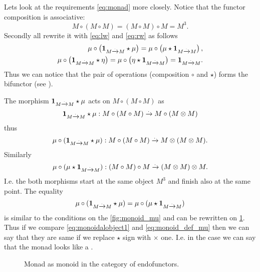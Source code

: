Lets look at the requirements \eqref{eq:monad} more closely. Notice
that the functor composition is associative:
\[
M \circ ( M \circ M ) = (M \circ M) \circ M = M^3.
\]
Secondly 
all rewrite it with \eqref{eq:lw} and \eqref{eq:rw} as follows
\begin{eqnarray}
  \mu \circ \left( \mathbf{1}_{ M \xrightarrow{.} M } \star \mu \right) = 
  \mu \circ \left( \mu \star \mathbf{1}_{ M \xrightarrow{.} M } \right), 
  \nonumber \\
  \mu \circ \left( \mathbf{1}_{ M \xrightarrow{.} M } \star \eta \right) = 
  \mu \circ \left( \eta \star \mathbf{1}_{ M \xrightarrow{.} M } \right) = \mathbf{1}_{ M \xrightarrow{.} M }.
  \label{eq:monad_p1}
\end{eqnarray}
Thus we can notice that the pair of operations (composition $\circ$
and  $\star$) forms the bifunctor (see
). 

The morphism $\mathbf{1}_{ M \xrightarrow{.} M } \star \mu$ acts on $M \circ ( M \circ M )$ as
\[
\mathbf{1}_{ M \xrightarrow{.} M } \star \mu : M \circ ( M \circ M ) \xrightarrow{.} M \circ (M \otimes M)
\]
thus
\[
\mu \circ (\mathbf{1}_{ M \xrightarrow{.} M } \star \mu) : M \circ ( M \circ M ) \xrightarrow{.} M \otimes (M \otimes M).
\]
Similarly 
\[
\mu \circ (\mu \star \mathbf{1}_{ M \xrightarrow{.} M }) : (M \circ  M) \circ M  \xrightarrow{.} ( M \otimes M) \otimes M.
\]
I.e. the both morphisms start at the same object $M^3$ and finish also
at the same point. The equality 
\begin{equation}
\mu \circ (\mathbf{1}_{ M \xrightarrow{.} M } \star \mu) = 
\mu \circ (\mu \star \mathbf{1}_{ M \xrightarrow{.} M })
\label{eq:monoidalobject1}
\end{equation}
is similar to the conditions on the \cref{fig:monoid_mu} and can be
rewritten on \cref{fig:monad_monoid1}. Thus if we compare
\eqref{eq:monoidalobject1} and \eqref{eq:monoid_def_mu} then we can say
that they are same if we replace $\star$ sign with $\times$ one. I.e.
in the case we can say that the monad looks like a
. 

\begin{figure}
  \centering
  \caption{Monad as monoid in the category of endofunctors.}
  \label{fig:monad_monoid1}
\end{figure}

